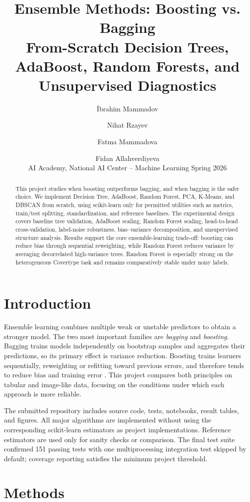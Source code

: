 \documentclass[11pt,twocolumn]{article}
\title{\textbf{Ensemble Methods: Boosting vs. Bagging}\\\large From-Scratch Decision Trees, AdaBoost, Random Forests, and Unsupervised Diagnostics}
\author{İbrahim Mammadov \and Nihat Rzayev \and Fatma Mammadova \and Fidan Allahverdiyeva\\AI Academy, National AI Center -- Machine Learning Spring 2026}
\date{}
\begin{document}
\maketitle
\begin{abstract}
This project studies when boosting outperforms bagging, and when bagging is the safer choice. We implement Decision Tree, AdaBoost, Random Forest, PCA, K-Means, and DBSCAN from scratch, using scikit-learn only for permitted utilities such as metrics, train/test splitting, standardization, and reference baselines. The experimental design covers baseline tree validation, AdaBoost scaling, Random Forest scaling, head-to-head cross-validation, label-noise robustness, bias--variance decomposition, and unsupervised structure analysis. Results support the core ensemble-learning trade-off: boosting can reduce bias through sequential reweighting, while Random Forest reduces variance by averaging decorrelated high-variance trees. Random Forest is especially strong on the heterogeneous Covertype task and remains comparatively stable under noisy labels.
\end{abstract}

\section{Introduction}
Ensemble learning combines multiple weak or unstable predictors to obtain a stronger model. The two most important families are \emph{bagging} and \emph{boosting}. Bagging trains models independently on bootstrap samples and aggregates their predictions, so its primary effect is variance reduction. Boosting trains learners sequentially, reweighting or refitting toward previous errors, and therefore tends to reduce bias and training error \cite{breiman1996bagging,freund1997decision}. This project compares both principles on tabular and image-like data, focusing on the conditions under which each approach is more reliable.

The submitted repository includes source code, tests, notebooks, result tables, and figures. All major algorithms are implemented without using the corresponding scikit-learn estimators as project implementations. Reference estimators are used only for sanity checks or comparison. The final test suite confirmed 151 passing tests with one multiprocessing integration test skipped by default; coverage reporting satisfies the minimum project threshold.

\section{Methods}
\end{document}
